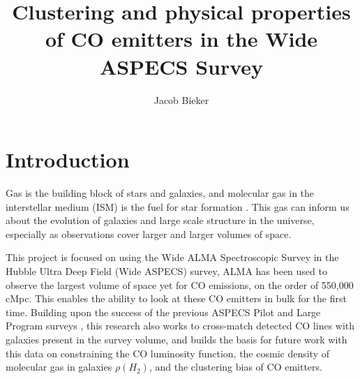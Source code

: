 \documentclass[twoside,single]{lion-msc}
\title{Clustering and physical properties of CO emitters in the Wide ASPECS Survey}
\author{Jacob Bieker}
\affiliation{Leiden Observatory, Leiden University}
\begin{document}
\maketitle

\setcounter{page}{2}
\tableofcontents
\cleardoublepage

\setcounter{page}{1}
\chapter{Introduction}






Gas is the building block of stars and galaxies, and molecular gas in the interstellar medium (ISM) is the fuel for star formation \cite{decarli2019alma}. This gas can inform us about the evolution of galaxies and large scale structure in the universe, especially as observations cover larger and larger volumes of space. %

This project is focused on using the Wide ALMA Spectroscopic Survey in the Hubble Ultra Deep Field (Wide ASPECS) survey, ALMA has been used to observe the largest volume of space yet for CO emissions, on the order of 550,000 cMpc. This enables the ability to look at these CO emitters in bulk for the first time. Building upon the success of the previous ASPECS Pilot and Large Program surveys \cite{walter2016alma, decarli2019alma}, this research also works to cross-match detected CO lines with galaxies present in the survey volume, and builds the basis for future work with this data on constraining the CO luminosity function, the cosmic density of molecular gas in galaxies $\rho(H_2)$, and the clustering bias of CO emitters.
\end{document}

